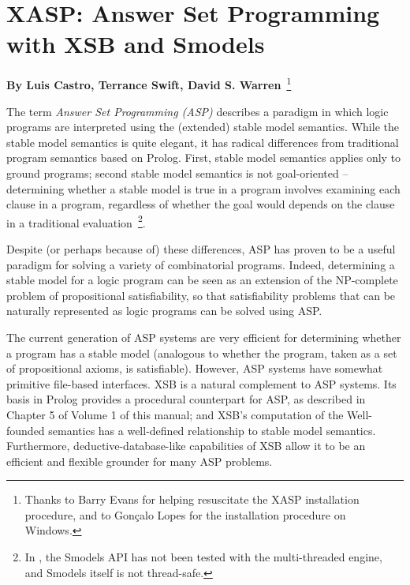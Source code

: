 \chapter{XASP: Answer Set Programming with XSB and Smodels}
\label{xasp}

\begin{center}
{\Large {\bf By Luis Castro, Terrance Swift, David
    S. Warren}~\footnote{ Thanks to Barry Evans for helping
    resuscitate the XASP installation procedure, and to Gon\c{c}alo Lopes
    for the installation procedure on Windows.}}
\end{center}

The term {\em Answer Set Programming (ASP)} describes a paradigm in
which logic programs are interpreted using the (extended) stable model
semantics.  While the stable model semantics is quite elegant, it has
radical differences from traditional program semantics based on
Prolog.  First, stable model semantics applies only to ground
programs; second stable model semantics is not goal-oriented --
determining whether a stable model is true in a program involves
examining each clause in a program, regardless of whether the goal would
depends on the clause in a traditional evaluation~\footnote{In
  \version{}, the Smodels API has not been tested with the
  multi-threaded engine, and Smodels itself is not thread-safe.}.

Despite (or perhaps because of) these differences, ASP has proven to
be a useful paradigm for solving a variety of combinatorial programs.
Indeed, determining a stable model for a logic program can be seen as
an extension of the NP-complete problem of propositional
satisfiability, so that satisfiability problems that can be naturally
represented as logic programs can be solved using ASP.  

The current generation of ASP systems are very efficient for
determining whether a program has a stable model (analogous to whether
the program, taken as a set of propositional axioms, is satisfiable).
However, ASP systems have somewhat primitive file-based interfaces.
XSB is a natural complement to ASP systems.  Its basis in Prolog
provides a procedural counterpart for ASP, as described in Chapter 5 of
Volume 1 of this manual; and XSB's computation of the Well-founded
semantics has a well-defined relationship to stable model semantics.
Furthermore, deductive-database-like capabilities of XSB allow it to
be an efficient and flexible grounder for many ASP problems.

